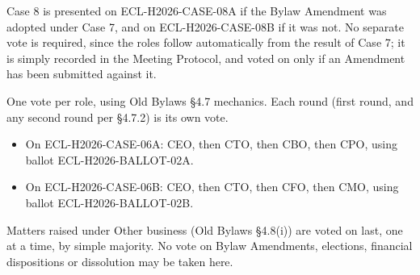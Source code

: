 \documentclass{../../../Common/Latex/Templates/rapport}
\begin{document}
Case 8 is presented on ECL-H2026-CASE-08A if the Bylaw Amendment was adopted under Case 7, and on ECL-H2026-CASE-08B if it was not. No separate vote is required, since the roles follow automatically from the result of Case 7; it is simply recorded in the Meeting Protocol, and voted on only if an Amendment has been submitted against it.

One vote per role, using Old Bylaws \S4.7 mechanics. Each round (first round, and any second round per \S4.7.2) is its own vote.
\begin{itemize}
  \item On ECL-H2026-CASE-06A: CEO, then CTO, then CBO, then CPO, using ballot ECL-H2026-BALLOT-02A.
  \item On ECL-H2026-CASE-06B: CEO, then CTO, then CFO, then CMO, using ballot ECL-H2026-BALLOT-02B.
\end{itemize}

Matters raised under Other business (Old Bylaws \S4.8(i)) are voted on last, one at a time, by simple majority. No vote on Bylaw Amendments, elections, financial dispositions or dissolution may be taken here.
\end{document}
